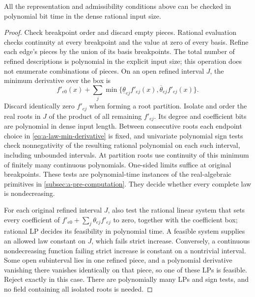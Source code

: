 \begin{proposition}
\label{prop:a-law-validation}
All the representation and admissibility conditions above can be checked
in polynomial bit time in the dense rational input size.
\end{proposition}
\begin{proof}
Check breakpoint order and discard empty pieces. Rational evaluation
checks continuity at every breakpoint and the value at zero of every
basis. Refine each edge's pieces by the union of its basis breakpoints.
The total number of refined descriptions is polynomial in the explicit
input size; this operation does not enumerate combinations of pieces.
On an open refined interval $J$, the minimum derivative over the box is
\begin{equation}
 f'_{e0}(x)+\sum_j\min\{
 \underline\theta_{ej}f'_{ej}(x),
 \overline\theta_{ej}f'_{ej}(x)\}.
 \label{eq:a-law-min-derivative}
\end{equation}
Discard identically zero $f'_{ej}$ when forming a root partition. Isolate
and order the real roots in $J$ of the product of all remaining $f'_{ej}$.
Its degree and coefficient bits are polynomial in dense input length.
Between consecutive roots each endpoint choice in
\cref{eq:a-law-min-derivative} is fixed, and univariate polynomial sign tests
check nonnegativity of the resulting rational polynomial on each such
interval, including unbounded intervals. At partition roots use continuity
of this minimum of finitely many continuous polynomials. One-sided limits
suffice at original breakpoints. These tests are polynomial-time instances
of the real-algebraic primitives in \cref{subsec:a-pre-computation}.
They decide whether every complete law is nondecreasing.

For each original refined interval $J$, also test the rational linear
system that sets every coefficient of
$f'_{e0}+\sum_j\theta_{ej}f'_{ej}$ to zero, together with the coefficient
box; rational LP decides its feasibility in polynomial time. A feasible
system supplies an allowed law constant on $J$, which fails strict
increase. Conversely, a continuous nondecreasing function failing strict
increase is constant on a nontrivial interval. Some open subinterval
lies in one refined piece, and a polynomial derivative vanishing there
vanishes identically on that piece, so one of these LPs is feasible.
Reject exactly in this case. There are polynomially many LPs and sign
tests, and no field containing all isolated roots is needed.
\end{proof}

